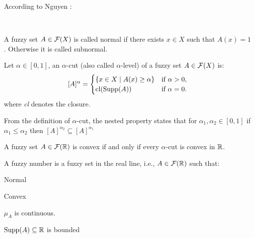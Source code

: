 According to Nguyen \cite{NGUYEN1978}:
 
\\




\begin{definition}
    A fuzzy set $A\in \mathcal{F}(X)$ is called normal if there exists $x\in X$ such that $A(x)=1$. Otherwise it is called subnormal.
\end{definition}

\begin{definition}
    Let $\alpha \in [0,1]$, an $\alpha$-cut (also called $\alpha$-level) of a fuzzy set \( A \in \mathcal{F}(X)\) is:
    \[
    [A]^\alpha =
    \begin{cases}
    \{x \in X \mid A(x)\geq \alpha\} & \text{if } \alpha > 0, \\
    \textnormal{cl}(\textnormal{Supp}(A)) & \text{if } \alpha = 0.
    \end{cases}
    \]
    where \textit{cl} denotes the closure.
\end{definition}

\begin{remark}
    From the definition of $\alpha$-cut, the nested property states that for
    $\alpha_1, \alpha_2 \in [0,1]$ if $\alpha_1\leq \alpha_2$ then $[A]^{\alpha_2}\subseteq [A]^{\alpha_1}$
\end{remark}

\begin{definition}[Convexity] A fuzzy set $A\in \mathcal{F}(\mathbb{R})$ is convex if and only if every $\alpha$-cut is convex in $\mathbb{R}$.
    
\end{definition}

\begin{definition}
    A fuzzy number is a fuzzy set in the real line, i.e., $A\in \mathcal{F}(\mathbb{R})$ such that:\vspace{-0.9em}
    \begin{romanenum}
        \item Normal\vspace{-0.5em}
        \item Convex\vspace{-0.5em}
        \item $\mu_A$ is continuous.\vspace{-0.5em}
        \item $\textnormal{Supp}(A)\subseteq\mathbb{R}$ is bounded
    \end{romanenum}
    
\end{definition}


